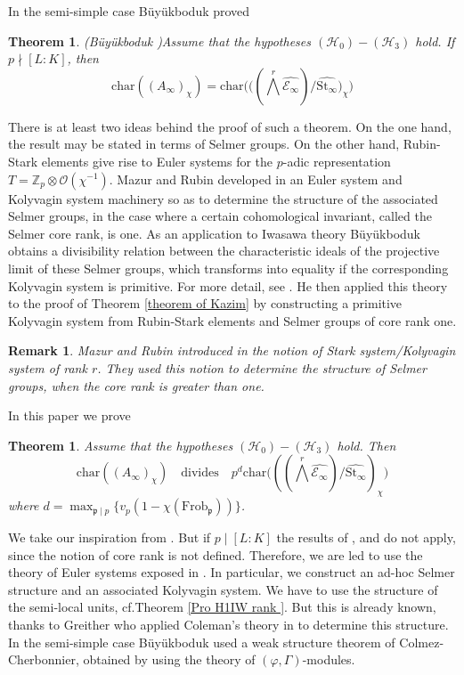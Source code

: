 \documentclass[reqno]{amsart}
\newcounter{dummy} \numberwithin{dummy}{section}
\newtheorem{theo}[dummy]{Theorem }
\newtheorem{rem}[dummy]{Remark}
\begin{document}
In the semi-simple case B\"{u}y\"{u}kboduk  proved
\begin{theo}(B\"{u}y\"{u}kboduk \cite[Theorem A]{Kazim109})\label{theorem of Kazim}
 Assume that the hypotheses $(\mathcal{H}_{0})-(\mathcal{H}_{3})$
 hold. If $p\nmid [L:K]$, then
$$
\mathrm{char}((A_{\infty})_{\chi})= \mathrm{char}
\bigg(\big((\bigwedge^{r}\widehat{\mathcal{E}_{\infty}})/\widehat{\mathrm{St}_{\infty}}\big)_{\chi}\bigg)
$$
\end{theo}
There is at least  two  ideas behind the proof of such a theorem. On
the one hand, the result may be stated in terms of Selmer groups. On
the other hand, Rubin-Stark elements give rise to Euler systems for
the $p$-adic representation $T=\mathbb{Z}_{p}\otimes
\mathcal{O}(\chi^{-1})$.
 Mazur and Rubin  developed in \cite{MR04} an Euler system and Kolyvagin system
machinery so as to determine the structure of the associated Selmer
groups, in the case where a certain cohomological invariant, called
the Selmer core rank, is one. As an application to Iwasawa theory
B\"{u}y\"{u}kboduk obtains a divisibility relation between the
characteristic ideals of the projective limit of these Selmer
groups, which transforms into equality if the corresponding
Kolyvagin system is primitive. For more detail, see \cite{Kazim107}.
He then applied this theory to the proof of Theorem \ref{theorem of
Kazim} by  constructing a primitive Kolyvagin system from
Rubin-Stark elements and  Selmer groups of core rank one.
\begin{rem}
 Mazur and Rubin introduced in \cite{MR 16} the notion of Stark
system/Kolyvagin system of rank $r$. They used this notion to
determine the structure of Selmer groups, when the core rank is
greater than one.
\end{rem}
  \vskip 6pt
 In this paper we prove
\begin{theo}\label{AMO2}
 Assume that the hypotheses $(\mathcal{H}_{0})-(\mathcal{H}_{3})$
 hold. Then
$$
\mathrm{char}((A_{\infty})_{\chi})\quad \mbox{divides}\quad p^{d}
\mathrm{char}
\big(((\bigwedge^{r}\widehat{\mathcal{E}_{\infty}})/\widehat{\mathrm{St}_{\infty}})_{\chi}\big)
$$
where $d=\displaystyle{\max_{\mathfrak{p}\mid
p}}\{v_{p}(1-\chi(\mathrm{Frob}_{\mathfrak{p}}))\}$.
\end{theo}
We take our inspiration from \cite{Kazim109}. But if $p\mid [L:K]$
the results of \cite{MR04}, \cite{MR 16} and \cite{Kazim107} do not
apply, since the notion of core rank is not defined. Therefore, we
are led to use the theory of Euler systems  exposed in
\cite{Rubin00}. In particular, we construct an ad-hoc Selmer
structure and an associated  Kolyvagin system. We have to use the
structure of the semi-local units, \;cf.\;Theorem \ref{Pro H1IW rank
}. But this is already known, thanks to Greither who applied
Coleman's theory in \cite{Greither96} to determine this structure.
In the semi-simple case B\"{u}y\"{u}kboduk
 used a weak structure theorem of  Colmez-Cherbonnier, obtained by
 using the theory of $(\varphi,\Gamma)$-modules.
 
\end{document}
